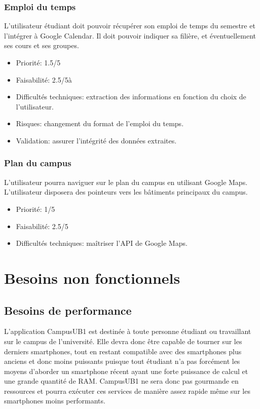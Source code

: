 \documentclass [pdftex,12pt] {report}
\begin{document}
\subsubsection{Emploi du temps}
L'utilisateur étudiant doit pouvoir récupérer son emploi de temps du semestre et l'intégrer à Google Calendar. Il doit pouvoir indiquer sa filière, et éventuellement ses cours et ses groupes. \\

\begin{itemize}
\renewcommand{\labelitemi}{$\bullet$}
\item Priorité: 1.5/5
\item Faisabilité: 2.5/5à
\item Difficultés techniques: extraction des informations en fonction du choix de l'utilisateur.
\item Risques: changement du format de l'emploi du temps.
\item Validation: assurer l'intégrité des données extraites.
\end{itemize}

\subsubsection{Plan du campus}
L'utilisateur pourra naviguer sur le plan du campus en utilisant Google Maps. L'utilisateur disposera des pointeurs vers les bâtiments principaux du campus. \\

\begin{itemize}
\renewcommand{\labelitemi}{$\bullet$}
\item Priorité: 1/5
\item Faisabilité: 2.5/5
\item Difficultés techniques: maîtriser l'API de Google Maps.
\end{itemize}



\section{Besoins non fonctionnels}
\subsection{Besoins de performance}
L'application CampusUB1 est destinée à toute personne étudiant ou travaillant sur le campus de l'université. Elle devra donc être capable de tourner sur les derniers smartphones, tout en restant compatible avec des smartphones plus anciens et donc moins puissants puisque tout étudiant n'a pas forcément les moyens d'aborder un smartphone récent ayant une forte puissance de calcul et une grande quantité de RAM. CampusUB1 ne sera donc pas gourmande en ressources et pourra exécuter ces services de manière assez rapide même sur les smartphones moins performants. \\
\end{document}
